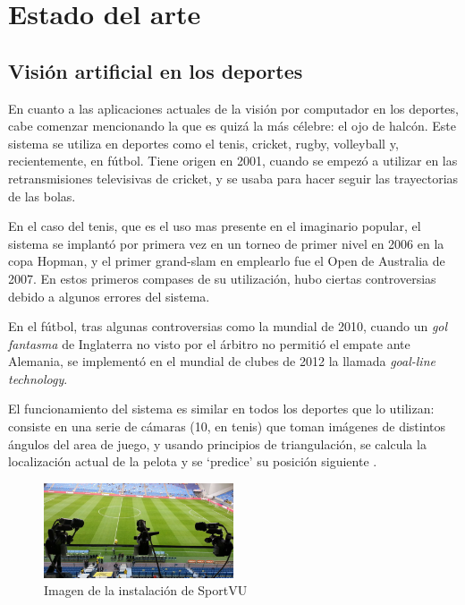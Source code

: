 \section{Estado del arte}


\subsection{Visión artificial en los deportes}
En cuanto a las aplicaciones actuales de la visión por computador en los deportes, cabe comenzar mencionando la que es quizá la más célebre: el ojo de halcón. Este sistema se utiliza en deportes como el tenis, cricket, rugby, volleyball y, recientemente, en fútbol. Tiene origen en 2001, cuando se empezó a utilizar en las retransmisiones televisivas de cricket, y se usaba para hacer seguir las trayectorias de las bolas.

En el caso del tenis, que es el uso mas presente en el imaginario popular, el sistema se implantó por primera vez en un torneo de primer nivel en 2006 en la copa Hopman, y el primer grand-slam en emplearlo fue el Open de Australia de 2007. En estos primeros compases de su utilización, hubo ciertas controversias debido a algunos errores del sistema.

En el fútbol, tras algunas controversias como la mundial de 2010, cuando un \textit{gol fantasma} de Inglaterra no visto por el árbitro no permitió el empate ante Alemania, se implementó en el mundial de clubes de 2012 la llamada \textit{goal-line technology}.

El funcionamiento del sistema es similar en todos los deportes que lo utilizan: consiste en una serie de cámaras (10, en tenis) que toman imágenes de distintos ángulos del area de juego, y usando principios de triangulación, se calcula la localización actual de la pelota y se `predice' su posición siguiente \cite{wiki:hawk}.

\begin{figure}
    \centering
    \includegraphics[width=0.5\textwidth]{images/sportVU}
    \caption{Imagen de la instalación de SportVU}
    \label{fig:sportVU}
\end{figure}

